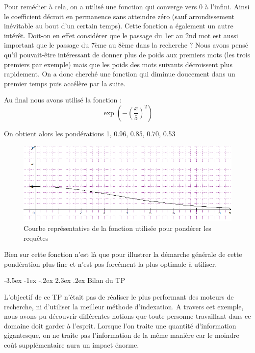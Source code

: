 \documentclass[a4paper,12pt]{article}
\makeatletter
\renewcommand\section{\@startsection {section}{1}{\z@}%
                           {-3.5ex \@plus -1ex \@minus -.2ex}%
                           {2.3ex \@plus.2ex}%
                           {\normalfont\Large\bfseries}}
\makeatother
\begin{document}
Pour remédier à cela, on a utilisé une fonction qui converge vers 0 à l'infini. Ainsi le coefficient décroit en permanence sans atteindre zéro (sauf arrondissement inévitable au bout d'un certain temps).
Cette fonction a également un autre intérêt. Doit-on en effet considérer que le passage du 1er au 2nd mot est aussi important que le passage du 7ème au 8ème dans la recherche ? Nous avons pensé qu'il pouvait-être
intéressant de donner plus de poids aux premiers mots (les trois premiers par exemple) mais que les poids des mots suivants décroissent plus rapidement. On a donc cherché une fonction qui diminue doucement dans un premier temps puis accélère par la suite.

Au final nous avons utilisé la fonction : \[\exp(-(\frac{x}{5})^{2})\]

On obtient alors les pondérations 1, 0.96, 0.85, 0.70, 0.53

\begin{figure}[H]
	\center
	\includegraphics[width=15cm]{courbe.png}
	\caption{Courbe représentative de la fonction utilisée pour pondérer les requêtes}
\end{figure}

Bien sur cette fonction n'est là que pour illustrer la démarche générale de cette pondération plus fine et n'est pas forcément la plus optimale à utiliser.

\section{Bilan du TP}

L'objectif de ce TP n'était pas de réaliser le plus performant des moteurs de recherche, ni d'utiliser la meilleur méthode d'indexation. A travers cet exemple, nous avons pu découvrir différentes notions
que toute personne travaillant dans ce domaine doit garder à l'esprit. Lorsque l'on traite une quantité d'information gigantesque, on ne traite pas l'information de la même manière car le moindre coût supplémentaire aura un impact énorme.
\end{document}
